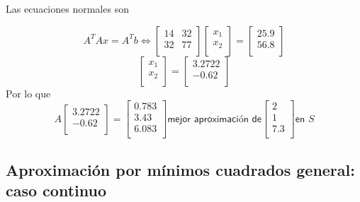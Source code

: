 \begin{ejemplo}
Las ecuaciones normales son

$$A^TAx = A^Tb \Leftrightarrow \begin{bmatrix}
14 & 32 \\
32 & 77 \\
\end{bmatrix}
\begin{bmatrix}
x_1 \\
x_2 \\
\end{bmatrix}
=
\begin{bmatrix}
25.9 \\
56.8 \\
\end{bmatrix}$$
$$
\begin{bmatrix}
x_1 \\
x_2 \\
\end{bmatrix}
=
\begin{bmatrix}
3.2722 \\
-0.62 \\
\end{bmatrix}
$$
Por lo que
$$ A \begin{bmatrix}
3.2722 \\
-0.62 \\
\end{bmatrix}
= 
\begin{bmatrix}
0.783 \\
3.43 \\
6.083 \\
\end{bmatrix} \textsf{mejor aproximación de} \begin{bmatrix}
2 \\
1 \\
7.3 \\
\end{bmatrix} \textsf{en } S$$

\end{ejemplo}

\subsection{Aproximación por mínimos cuadrados general: caso continuo}